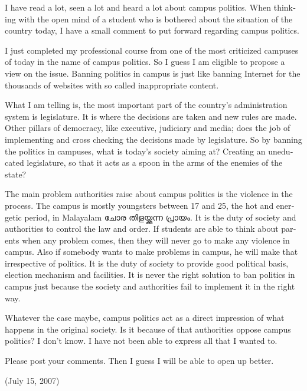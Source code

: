 \begin{english}
\enlargethispage*{2\baselineskip}
I have read a lot, seen a lot and heard a lot about campus politics. 
When thinking with the open mind of a student who is bothered about 
the situation of the country today, I have a small comment to put forward regarding campus politics.

I just completed my professional course from one of the most criticized campuses of 
today in the name of campus politics. So I guess I am eligible to propose a view on the issue. 
Banning politics in campus is just like banning Internet for the thousands of websites with 
so called inappropriate content.

What I am telling is, the most important part of the country’s administration system is legislature. 
It is where the decisions are taken and new rules are made. Other pillars of democracy, 
like executive, judiciary and media; does the job of implementing and cross checking the decisions 
made by legislature. So by banning the politics in campuses, what is today's society aiming at? Creating an 
uneducated legislature, so that it acts as a spoon in the arms of the enemies of the state?

The main problem authorities raise about campus politics is the violence in the process. The campus
is mostly youngsters between 17 and 25, the hot and energetic period, in Malayalam \textmalayalam{ചോര തിളയ്ക്കുന്ന പ്രായം. }
It is the duty of society and authorities to control the law and order. If students are able to think about
parents when any problem comes, then they will never go to make any violence in campus. Also if somebody wants 
to make problems in campus, he will make that irrespective of politics. It is the duty of society to provide good
political basis, election mechanism and facilities. It is never the right solution to ban politics in campus just 
because the society and authorities fail to implement it in the right way. 

Whatever the case maybe, campus politics act as a direct impression of what happens in the original society. 
Is it because of that authorities oppose campus politics? I don’t know. I have not been able to express all that I wanted to. 

Please post your comments. Then I guess I will be able to open up better. 

\begin{flushright}(July 15, 2007)\end{flushright}
\end{english}
\newpage
